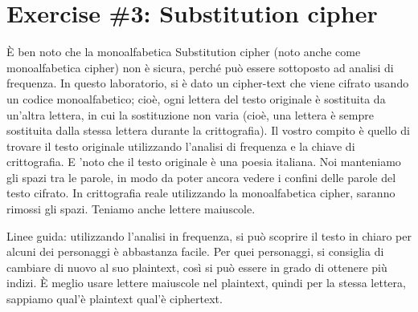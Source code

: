\documentclass[11pt]{article}
\begin{document}
    \hypertarget{exercise-3-substitution-cipher}{%
\section{Exercise \#3: Substitution
cipher}\label{exercise-3-substitution-cipher}}

    È ben noto che la monoalfabetica Substitution cipher (noto anche come
monoalfabetica cipher) non è sicura, perché può essere sottoposto ad
analisi di frequenza. In questo laboratorio, si è dato un cipher-text
che viene cifrato usando un codice monoalfabetico; cioè, ogni lettera
del testo originale è sostituita da un'altra lettera, in cui la
sostituzione non varia (cioè, una lettera è sempre sostituita dalla
stessa lettera durante la crittografia). Il vostro compito è quello di
trovare il testo originale utilizzando l'analisi di frequenza e la
chiave di crittografia. E 'noto che il testo originale è una poesia
italiana. Noi manteniamo gli spazi tra le parole, in modo da poter
ancora vedere i confini delle parole del testo cifrato. In crittografia
reale utilizzando la monoalfabetica cipher, saranno rimossi gli spazi.
Teniamo anche lettere maiuscole.

Linee guida: utilizzando l'analisi in frequenza, si può scoprire il
testo in chiaro per alcuni dei personaggi è abbastanza facile. Per quei
personaggi, si consiglia di cambiare di nuovo al suo plaintext, così si
può essere in grado di ottenere più indizi. È meglio usare lettere
maiuscole nel plaintext, quindi per la stessa lettera, sappiamo qual'è
plaintext qual'è ciphertext.
\end{document}
